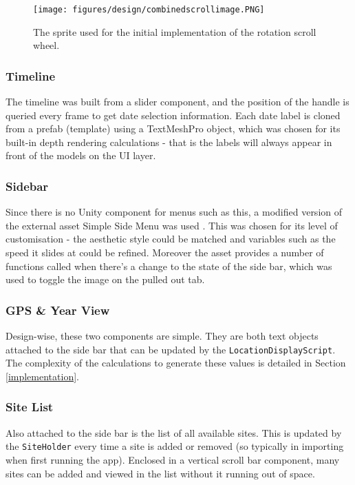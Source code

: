 \documentclass[12pt, a4paper]{article}
\begin{document}
\begin{figure}[h!]
    \centering
    \texttt{[image: figures/design/combinedscrollimage.PNG]}
        \caption{The sprite used for the initial implementation of the rotation scroll wheel.}
        \label{fig:scroll}
\end{figure}

\subsubsection{Timeline}
The timeline was built from a slider component, and the position of the handle is queried every frame to get date selection information. Each date label is cloned from a prefab (template) using a TextMeshPro object, which was chosen for its built-in depth rendering calculations - that is the labels will always appear in front of the models on the UI layer.

\subsubsection{Sidebar}
Since there is no Unity component for menus such as this, a modified version of the external asset Simple Side Menu was used \cite{design:sidemenu}. This was chosen for its level of customisation - the aesthetic style could be matched and variables such as the speed it slides at could be refined. Moreover the asset provides a number of functions called when there's a change to the state of the side bar, which was used to toggle the image on the pulled out tab.

\subsubsection{GPS \& Year View}
Design-wise, these two components are simple. They are both text objects attached to the side bar that can be updated by the \verb|LocationDisplayScript|. The complexity of the calculations to generate these values is detailed in Section \ref{implementation}.

\subsubsection{Site List}
Also attached to the side bar is the list of all available sites. This is updated by the \verb|SiteHolder| every time a site is added or removed (so typically in importing when first running the app). Enclosed in a vertical scroll bar component, many sites can be added and viewed in the list without it running out of space.
\end{document}
